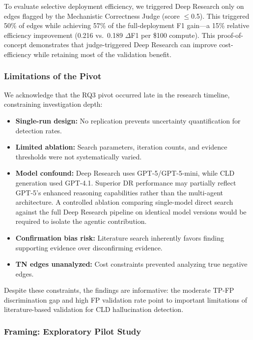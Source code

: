 To evaluate selective deployment efficiency, we triggered Deep Research only on edges flagged by the Mechanistic Correctness Judge (score $\leq$0.5). This triggered 50\% of edges while achieving 57\% of the full-deployment F1 gain---a 15\% relative efficiency improvement (0.216 vs.\ 0.189 $\Delta$F1 per \$100 compute). This proof-of-concept demonstrates that judge-triggered Deep Research can improve cost-efficiency while retaining most of the validation benefit.

\subsubsection{Limitations of the Pivot}

We acknowledge that the RQ3 pivot occurred late in the research timeline, constraining investigation depth:
\begin{itemize}[noitemsep]
    \item \textbf{Single-run design:} No replication prevents uncertainty quantification for detection rates.
    \item \textbf{Limited ablation:} Search parameters, iteration counts, and evidence thresholds were not systematically varied.
    \item \textbf{Model confound:} Deep Research uses GPT-5/GPT-5-mini, while CLD generation used GPT-4.1. Superior DR performance may partially reflect GPT-5's enhanced reasoning capabilities rather than the multi-agent architecture. A controlled ablation comparing single-model direct search against the full Deep Research pipeline on identical model versions would be required to isolate the agentic contribution.
    \item \textbf{Confirmation bias risk:} Literature search inherently favors finding supporting evidence over disconfirming evidence.
    \item \textbf{TN edges unanalyzed:} Cost constraints prevented analyzing true negative edges.
\end{itemize}

Despite these constraints, the findings are informative: the moderate TP-FP discrimination gap and high FP validation rate point to important limitations of literature-based validation for CLD hallucination detection.

\subsubsection{Framing: Exploratory Pilot Study}

